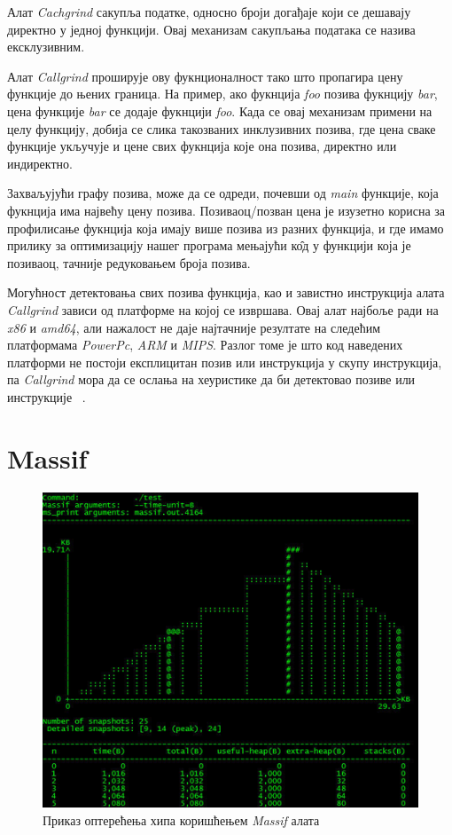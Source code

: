 \documentclass[12pt,oneside]{memoir}
\begin{document}
\indent Алат \textit{Cachgrind} сакупља податке, односно броји догађаје који се дешавају директно у једној функцији. Овај механизам сакупљања података се назива ексклузивним.

\indent Алат \textit{Callgrind} проширује ову фукнционалност тако што пропагира цену функције до њених граница. На пример, ако фукнција \textit{foo} позива фукнцију \textit{bar}, цена функције \textit{bar} се додаје фукнцији \textit{foo}. Када се овај механизам примени на целу функцију, добија се слика такозваних инклузивних позива, где цена сваке функције укључује и цене свих фукнција које она позива, директно или индиректно.

\indent Захваљујући графу позива, може да се одреди, почевши од \textit{main} функције, која фукнција има највећу цену позива. Позиваоц/позван цена је изузетно корисна за профилисање фукнција која имају више позива из разних функција, и где имамо прилику за оптимизацију нашег програма мењајући к\^{о}д у функцији која је позиваоц, тачније редуковањем броја позива.

\indent Могућност детектовања свих позива функција, као и завистно инструкција алата  \textit{Callgrind} зависи од платформе на којој се извршава. Овај алат најбоље ради на \textit{x86} и \textit{amd64}, али нажалост не даје најтачније резултате на следећим платформама \textit{PowerPc}, \textit{ARM} и \textit{MIPS}. Разлог томе је што код наведених платформи не постоји експлицитан позив или инструкција у скупу инструкција, па  \textit{Callgrind} мора да се ослања на хеуристике да би детектовао позиве или инструкције ~\cite{callgrindRef}.


\section{Massif}
\label{section_massif}

\begin{figure}[h!]
\begin{center}
\includegraphics[scale=0.75]{slika19.png}
\end{center}
\caption{Приказ оптерећења хипа коришћењем \textit{Massif} алата}
\label{fig:massif}
\end{figure}
\end{document}
